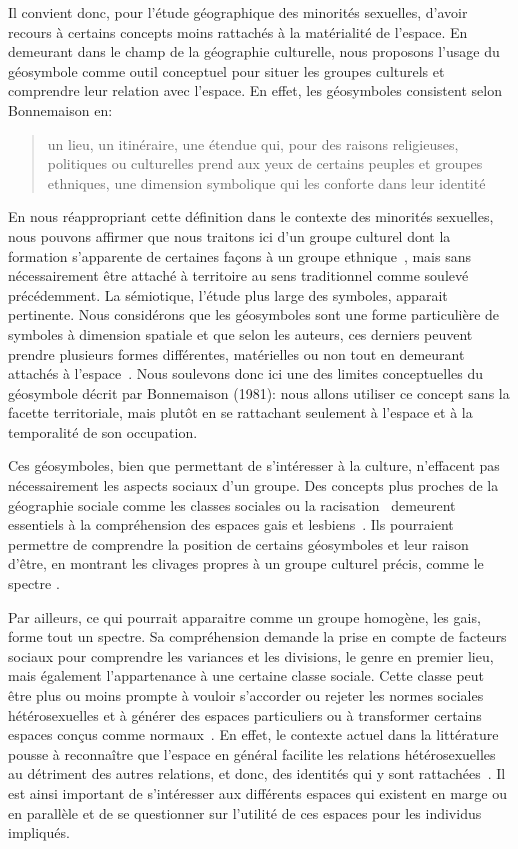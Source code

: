 Il convient donc, pour l'étude géographique des minorités sexuelles, d'avoir recours à certains concepts moins rattachés à la matérialité de l'espace.
En demeurant dans le champ de la géographie culturelle, nous proposons l'usage du géosymbole comme outil conceptuel pour situer les groupes culturels et comprendre leur relation avec l'espace.
En effet, les géosymboles consistent selon Bonnemaison en: \blockquote[{\cite[256]{Bonnemaison1981}}][.]{\textelp{} un lieu, un  itinéraire, une étendue qui, pour des raisons religieuses, politiques ou   culturelles prend aux yeux de certains peuples et groupes ethniques, une   dimension symbolique qui les conforte dans leur identité }.
En nous réappropriant cette définition dans le contexte des minorités sexuelles, nous pouvons affirmer que nous traitons ici d'un groupe culturel dont la formation s'apparente de certaines façons à un groupe ethnique~\citep{Sinfield1996}, mais sans nécessairement être attaché à territoire au sens traditionnel comme soulevé précédemment.
La sémiotique, l'étude plus large des symboles, apparait pertinente.
Nous considérons que les géosymboles sont une forme particulière de symboles à dimension spatiale et que selon les auteurs, ces derniers peuvent prendre plusieurs formes différentes, matérielles ou non tout en demeurant attachés à l'espace~\citep{Bonnemaison1981,Bedard2002}.
Nous soulevons donc ici une des limites conceptuelles du géosymbole décrit par Bonnemaison (1981): nous allons utiliser ce concept sans la facette territoriale, mais plutôt en se rattachant seulement à l'espace et à la temporalité de son occupation.

Ces géosymboles, bien que permettant de s'intéresser à la culture, n'effacent pas nécessairement les aspects sociaux d'un groupe.
Des concepts plus proches de la géographie sociale comme les classes sociales ou la racisation~\citep{Bonniol2005} demeurent essentiels à la compréhension des espaces gais et lesbiens~\citep[93]{Oswin2008}.
Ils pourraient permettre de comprendre la position de certains géosymboles et leur raison d'être, en montrant les clivages propres à un groupe culturel précis, comme le spectre \lgbt{}.

Par ailleurs, ce qui pourrait apparaitre comme un groupe homogène, les gais, forme tout un spectre.
Sa compréhension demande la prise en compte de facteurs sociaux pour comprendre les variances et les divisions, le genre en premier lieu, mais également l'appartenance à une certaine classe sociale.
Cette classe peut être plus ou moins prompte à vouloir s'accorder ou rejeter les normes sociales hétérosexuelles et à générer des espaces particuliers ou à transformer certains espaces conçus comme normaux~\citep{Lewis2011}.
En effet, le contexte actuel dans la littérature pousse à reconnaître que l'espace en général facilite les relations hétérosexuelles au détriment des autres relations, et donc, des identités qui y sont rattachées~\citep{Brown2003}.
Il est ainsi important de s'intéresser aux différents espaces qui existent en marge ou en parallèle et de se questionner sur l'utilité de ces espaces pour les individus impliqués.

